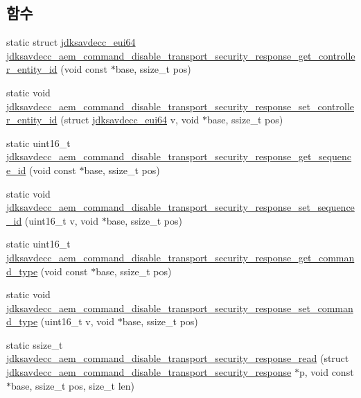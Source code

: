 \subsection*{함수}
\begin{DoxyCompactItemize}
\item 
static struct \hyperlink{structjdksavdecc__eui64}{jdksavdecc\+\_\+eui64} \hyperlink{group__command__disable__transport__security__response_gaaa79f3fb16b339574eba44b18e630ca8}{jdksavdecc\+\_\+aem\+\_\+command\+\_\+disable\+\_\+transport\+\_\+security\+\_\+response\+\_\+get\+\_\+controller\+\_\+entity\+\_\+id} (void const $\ast$base, ssize\+\_\+t pos)
\item 
static void \hyperlink{group__command__disable__transport__security__response_ga54fb2368107aae3241fe30f8cf15d098}{jdksavdecc\+\_\+aem\+\_\+command\+\_\+disable\+\_\+transport\+\_\+security\+\_\+response\+\_\+set\+\_\+controller\+\_\+entity\+\_\+id} (struct \hyperlink{structjdksavdecc__eui64}{jdksavdecc\+\_\+eui64} v, void $\ast$base, ssize\+\_\+t pos)
\item 
static uint16\+\_\+t \hyperlink{group__command__disable__transport__security__response_gaadec7eaa22bff01d25083b04f081b806}{jdksavdecc\+\_\+aem\+\_\+command\+\_\+disable\+\_\+transport\+\_\+security\+\_\+response\+\_\+get\+\_\+sequence\+\_\+id} (void const $\ast$base, ssize\+\_\+t pos)
\item 
static void \hyperlink{group__command__disable__transport__security__response_ga37d5c9da0ec41889494caabf513a4c0f}{jdksavdecc\+\_\+aem\+\_\+command\+\_\+disable\+\_\+transport\+\_\+security\+\_\+response\+\_\+set\+\_\+sequence\+\_\+id} (uint16\+\_\+t v, void $\ast$base, ssize\+\_\+t pos)
\item 
static uint16\+\_\+t \hyperlink{group__command__disable__transport__security__response_ga7a2ef0a51433537e5ec4613496f658c5}{jdksavdecc\+\_\+aem\+\_\+command\+\_\+disable\+\_\+transport\+\_\+security\+\_\+response\+\_\+get\+\_\+command\+\_\+type} (void const $\ast$base, ssize\+\_\+t pos)
\item 
static void \hyperlink{group__command__disable__transport__security__response_ga8b38b8dcacbcff3d271f1b75b9f19066}{jdksavdecc\+\_\+aem\+\_\+command\+\_\+disable\+\_\+transport\+\_\+security\+\_\+response\+\_\+set\+\_\+command\+\_\+type} (uint16\+\_\+t v, void $\ast$base, ssize\+\_\+t pos)
\item 
static ssize\+\_\+t \hyperlink{group__command__disable__transport__security__response_ga967eb99d0c1982bd2f241d554282959f}{jdksavdecc\+\_\+aem\+\_\+command\+\_\+disable\+\_\+transport\+\_\+security\+\_\+response\+\_\+read} (struct \hyperlink{structjdksavdecc__aem__command__disable__transport__security__response}{jdksavdecc\+\_\+aem\+\_\+command\+\_\+disable\+\_\+transport\+\_\+security\+\_\+response} $\ast$p, void const $\ast$base, ssize\+\_\+t pos, size\+\_\+t len)

\end{DoxyCompactItemize}
